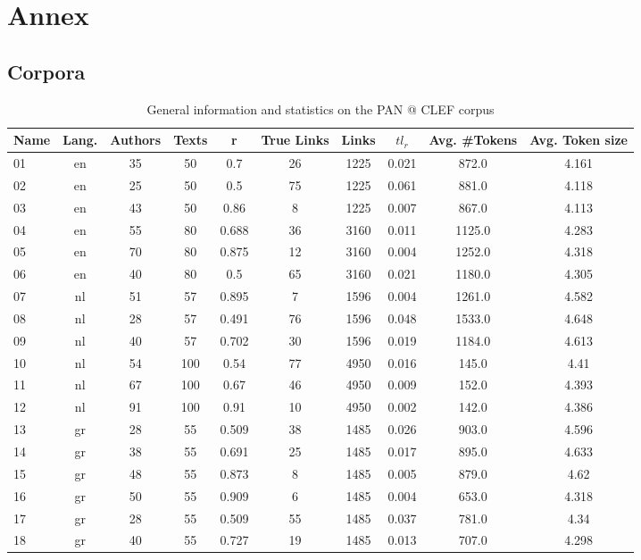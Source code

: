 \section{Annex \label{sec:annex}}

\subsection{Corpora}
\label{sec:annex_dataset_corpus}

\begin{table}[H]
  \centering
  \caption{General information and statistics on the PAN @ CLEF corpus}
  \label{tab:pan_corpus}

  \begin{tabular}{l c c c c c c c c c}
    \toprule
    \textbf{Name} &
    \textbf{Lang.} &
    \textbf{Authors} &
    \textbf{Texts} &
    \textbf{r} &
    \textbf{True Links} &
    \textbf{Links} &
    \textbf{$tl_r$} &
    \textbf{Avg. \#Tokens} &
    \textbf{Avg. Token size} \\
    \midrule
      01 & en & 35 & 50 & 0.7 & 26 & 1225 & 0.021 & 872.0 & 4.161 \\
      02 & en & 25 & 50 & 0.5 & 75 & 1225 & 0.061 & 881.0 & 4.118 \\
      03 & en & 43 & 50 & 0.86 & 8 & 1225 & 0.007 & 867.0 & 4.113 \\
      04 & en & 55 & 80 & 0.688 & 36 & 3160 & 0.011 & 1125.0 & 4.283 \\
      05 & en & 70 & 80 & 0.875 & 12 & 3160 & 0.004 & 1252.0 & 4.318 \\
      06 & en & 40 & 80 & 0.5 & 65 & 3160 & 0.021 & 1180.0 & 4.305 \\
      07 & nl & 51 & 57 & 0.895 & 7 & 1596 & 0.004 & 1261.0 & 4.582 \\
      08 & nl & 28 & 57 & 0.491 & 76 & 1596 & 0.048 & 1533.0 & 4.648 \\
      09 & nl & 40 & 57 & 0.702 & 30 & 1596 & 0.019 & 1184.0 & 4.613 \\
      10 & nl & 54 & 100 & 0.54 & 77 & 4950 & 0.016 & 145.0 & 4.41 \\
      11 & nl & 67 & 100 & 0.67 & 46 & 4950 & 0.009 & 152.0 & 4.393 \\
      12 & nl & 91 & 100 & 0.91 & 10 & 4950 & 0.002 & 142.0 & 4.386 \\
      13 & gr & 28 & 55 & 0.509 & 38 & 1485 & 0.026 & 903.0 & 4.596 \\
      14 & gr & 38 & 55 & 0.691 & 25 & 1485 & 0.017 & 895.0 & 4.633 \\
      15 & gr & 48 & 55 & 0.873 & 8 & 1485 & 0.005 & 879.0 & 4.62 \\
      16 & gr & 50 & 55 & 0.909 & 6 & 1485 & 0.004 & 653.0 & 4.318 \\
      17 & gr & 28 & 55 & 0.509 & 55 & 1485 & 0.037 & 781.0 & 4.34 \\
      18 & gr & 40 & 55 & 0.727 & 19 & 1485 & 0.013 & 707.0 & 4.298 \\
    \bottomrule
  \end{tabular}


\end{table}
